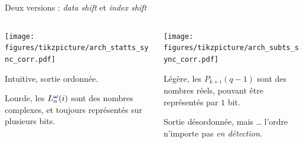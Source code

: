\documentclass[../main.tex]{subfiles}
\begin{document}
\begin{frame}{Deux versions : \textit{data shift} et \textit{index shift}}{}
  \centering

  \vspace{-1 em}
  \begin{columns}
    \begin{column}{.5\linewidth}
      \begin{overlayarea}{\linewidth}{.9\textheight}
        \centering
        \texttt{[image: figures/tikzpicture/arch\_statts\_sync\_corr.pdf]}

        \begin{ctrlitemize}{0pt}
          \item [\bonus] Intuitive, sortie ordonnée.
          \item [\malus] Lourde, les $L^{\textcolor{blue}{\bm{\omega}}}_{n}(i)$ sont des nombres complexes, et toujours représentés sur plusieurs bits.
        \end{ctrlitemize}
      \end{overlayarea}
    \end{column}
    \begin{column}{.5\linewidth}
      \begin{overlayarea}{\linewidth}{.9\textheight}
        \centering
        \texttt{[image: figures/tikzpicture/arch\_subts\_sync\_corr.pdf]}

        \begin{ctrlitemize}{0pt}
          \item [\bonus] Légère, les $P_{k + i}(q - 1)$ sont des nombres réels, pouvant être représentés par $1$ bit.
          \item [\textcolor{RoyalBlue}{\malus}] Sortie désordonnée, mais \dots{} l'ordre n'importe pas \textit{en détection}.
        \end{ctrlitemize}
      \end{overlayarea}
    \end{column}
  \end{columns}
\end{frame}
\end{document}
